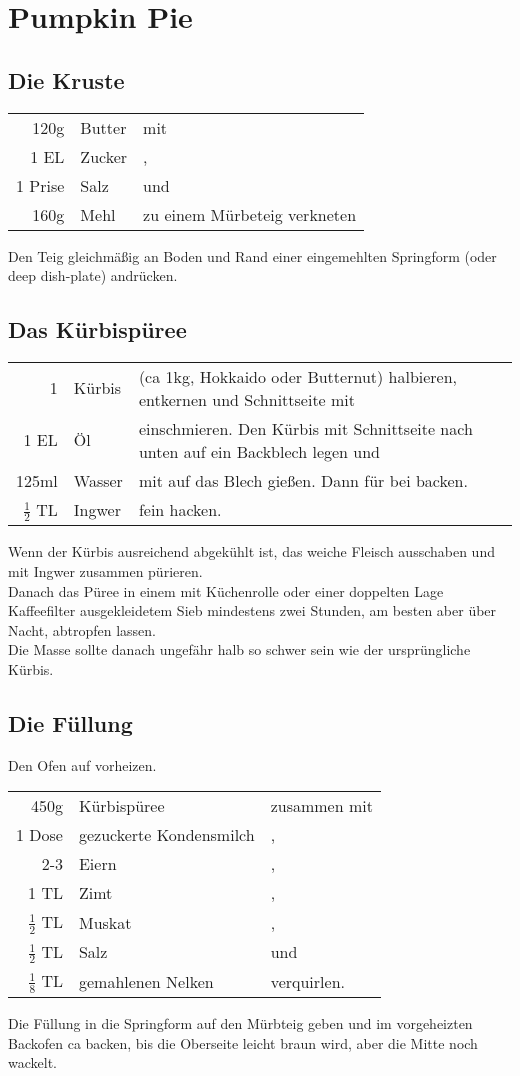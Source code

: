 \section{Pumpkin Pie}
\subsection*{Die Kruste}
\begin{longtable}{rlL{17.2cm}}
	120g	&	Butter	&	mit\\
	1 EL	&	Zucker	&	,\\
	1 Prise	&	Salz	&	und\\
	160g	&	Mehl	&	zu einem Mürbeteig verkneten\\
\end{longtable}

Den Teig gleichmäßig an Boden und Rand einer eingemehlten Springform (oder deep dish-plate) andrücken.
\subsection*{Das Kürbispüree}
\begin{longtable}{rlL{18.3cm}}
	1					&	Kürbis	&	(ca 1kg, Hokkaido oder Butternut) halbieren, entkernen und Schnittseite mit\\
	1 EL				&	Öl		& 	einschmieren. Den Kürbis mit Schnittseite nach unten auf ein Backblech legen und\\
	125ml				&	Wasser	& 	mit auf das Blech gießen. Dann für  bei  backen.\\
	$\frac{1}{2}$ TL	&	Ingwer	&	fein hacken.\\
\end{longtable}

Wenn der Kürbis ausreichend abgekühlt ist, das weiche Fleisch ausschaben und mit Ingwer zusammen pürieren.\\
Danach das Püree in einem mit Küchenrolle oder einer doppelten Lage Kaffeefilter ausgekleidetem Sieb mindestens zwei Stunden, am besten aber über Nacht, abtropfen lassen.\\
Die Masse sollte danach ungefähr halb so schwer sein wie der ursprüngliche Kürbis.

\subsection*{Die Füllung}
Den Ofen auf 	 vorheizen.\\
\begin{longtable}{rlL{14.9cm}}
	450g				&	Kürbispüree				&	zusammen mit\\
	1 Dose				&	gezuckerte Kondensmilch	&	,\\
	2-3					&	Eiern					&	, \\
	1 TL				&	Zimt					&	,\\
	$\frac{1}{2}$ TL	&	Muskat					&	,\\
	$\frac{1}{2}$ TL	&	Salz					&	und\\
	$\frac{1}{8}$ TL	&	gemahlenen Nelken		&	verquirlen.\\
\end{longtable}

Die Füllung in die Springform auf den Mürbteig geben und im vorgeheizten Backofen ca  backen, bis die Oberseite leicht braun wird, aber die Mitte noch wackelt.